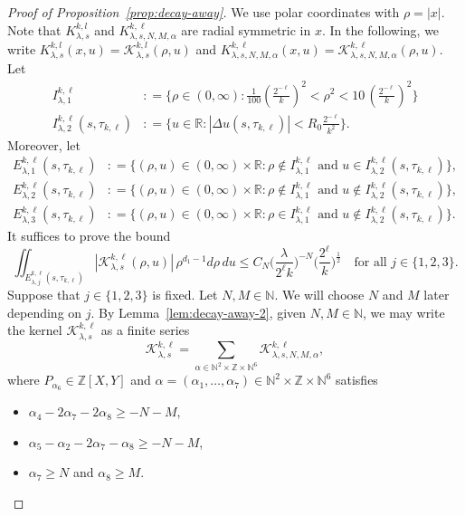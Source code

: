\documentclass[leqno]{amsart}
\theoremstyle{definition}
\theoremstyle{remark}
\numberwithin{equation}{section}
\newcommand{\R}{\mathbb{R}}
\newcommand{\N}{\mathbb{N}}
\newcommand{\Z}{\mathbb{Z}}
\begin{document}
\begin{proof}[Proof of Proposition~\ref{prop:decay-away}]
We use polar coordinates with $\rho = |x|$. Note that $K_{\lambda,s}^{k,l}$ and $K_{\lambda,s,N,M,\alpha}^{k,\ell}$ are radial symmetric in $x$. In the following, we write $K_{\lambda,s}^{k,l}(x,u) = \mathcal K_{\lambda,s}^{k,l} (\rho,u) $ and $K_{\lambda,s,N,M,\alpha}^{k,\ell}(x,u) = \mathcal K_{\lambda,s,N,M,\alpha}^{k,\ell}(\rho,u)$.
Let
\begin{align*}
I_{\lambda,1}^{k,\ell} &: = \{ \rho\in (0,\infty):
\tfrac{1}{100}(\tfrac{2^{-\ell}}{k})^2 < \rho^2 < 10 \, (\tfrac{2^{-\ell}}{k})^2 
\} \\
I_{\lambda,2}^{k,\ell}(s,\tau_{k,\ell}) &: = 
\{ u \in \R:
\left|\Delta u (s,\tau_{k,\ell})\right| < R_0  \tfrac{2^{-\ell}}{k^2}\}.
\end{align*}
Moreover, let 
\begin{align*}
E_{\lambda,1}^{k,\ell}(s,\tau_{k,\ell})
&: = \{(\rho,u)\in(0,\infty) \times \R :\rho\notin I_{\lambda,1}^{k,\ell} \text{ and } u \in I_{\lambda,2}^{k,\ell}(s,\tau_{k,\ell}) \},\\
E_{\lambda,2}^{k,\ell}(s,\tau_{k,\ell})
&: = \{(\rho,u)\in(0,\infty) \times \R :\rho\notin I_{\lambda,1}^{k,\ell} \text{ and } u \notin I_{\lambda,2}^{k,\ell}(s,\tau_{k,\ell}) \},\\
E_{\lambda,3}^{k,\ell}(s,\tau_{k,\ell})
&: = \{(\rho,u)\in(0,\infty) \times \R : \rho\in I_{\lambda,1}^{k,\ell} \text{ and } u \notin I_{\lambda,2}^{k,\ell}(s,\tau_{k,\ell}) \}.
\end{align*}
It suffices to prove the bound 
\[
\iint_{E_{\lambda,j}^{k,\ell}(s,\tau_{k,\ell})} |\mathcal K_{\lambda,s}^{k,\ell}(\rho,u)| \, \rho^{d_1-1} d\rho \, du\le C_N
\Big(\frac{\lambda}{2^\ell k}\Big)^{-N}\Big(\frac{2^{\ell}}{k}\Big)^{\frac{1}{2}}\quad \text{for all } j\in\{1,2,3\}.
\]
Suppose that $j\in\{1,2,3\}$ is fixed. Let $N,M\in\N$. We will choose $N$ and $M$ later depending on $j$. By Lemma~\ref{lem:decay-away-2}, given $N,M\in\N$, we may write the kernel $\mathcal K_{\lambda,s}^{k,\ell}$ as a finite series
\[
\mathcal K_{\lambda,s}^{k,\ell} = \sum_{\alpha\in \N^2 \times \Z\times \N^6} \mathcal K_{\lambda,s,N,M,\alpha}^{k,\ell},
\]
where $P_{\alpha_6}\in \Z[X,Y]$ and $\alpha = (\alpha_1,\dots,\alpha_7)\in \N^2 \times \Z\times \N^6$ satisfies
\begin{itemize}
 \item $\alpha_ 4 -2\alpha_7-2\alpha_8\ge -N-M$,
 \item $\alpha_5-\alpha_2-2\alpha_7-\alpha_8\ge -N-M$,
 \item $\alpha_7\ge N$ and $\alpha_8\ge M$.

\end{itemize}
\end{proof}
\end{document}
